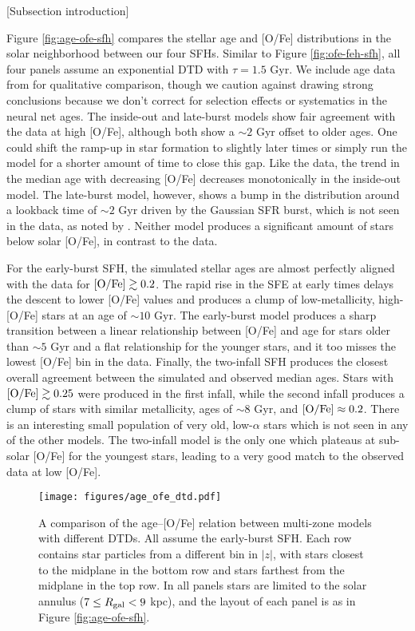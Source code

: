 \documentclass[twocolumn,twocolappendix,linenumbers,trackchanges]{aastex631}
\begin{document}
[Subsection introduction]

Figure \ref{fig:age-ofe-sfh} compares the stellar age and [O/Fe] distributions in the solar neighborhood between our four SFHs. Similar to Figure \ref{fig:ofe-feh-sfh}, all four panels assume an exponential DTD with $\tau=1.5$ Gyr. We include age data from  for qualitative comparison, though we caution against drawing strong conclusions because we don't correct for selection effects or systematics in the neural net ages. The inside-out and late-burst models show fair agreement with the data at high [O/Fe], although both show a $\sim2$ Gyr offset to older ages. One could shift the ramp-up in star formation to slightly later times or simply run the model for a shorter amount of time to close this gap. Like the data, the trend in the median age with decreasing [O/Fe] decreases monotonically in the inside-out model. The late-burst model, however, shows a bump in the distribution around a lookback time of $\sim2$ Gyr driven by the Gaussian SFR burst, which is not seen in the data, as noted by . Neither model produces a significant amount of stars below solar [O/Fe], in contrast to the data.

For the early-burst SFH, the simulated stellar ages are almost perfectly aligned with the data for ${\rm [O/Fe]}\gtrsim 0.2$. The rapid rise in the SFE at early times delays the descent to lower [O/Fe] values and produces a clump of low-metallicity, high-[O/Fe] stars at an age of $\sim10$ Gyr. The early-burst model produces a sharp transition between a linear relationship between [O/Fe] and age for stars older than $\sim5$ Gyr and a flat relationship for the younger stars, and it too misses the lowest [O/Fe] bin in the data. Finally, the two-infall SFH produces the closest overall agreement between the simulated and observed median ages. Stars with ${\rm [O/Fe]}\gtrsim 0.25$ were produced in the first infall, while the second infall produces a clump of stars with similar metallicity, ages of $\sim8$ Gyr, and ${\rm [O/Fe]}\approx0.2$. There is an interesting small population of very old, low-$\alpha$ stars which is not seen in any of the other models. The two-infall model is the only one which plateaus at sub-solar [O/Fe] for the youngest stars, leading to a very good match to the observed data at low [O/Fe].

\begin{figure*}
    \centering
    \texttt{[image: figures/age\_ofe\_dtd.pdf]}
    \caption{A comparison of the age--[O/Fe] relation between multi-zone models with different DTDs. All assume the early-burst SFH. Each row contains star particles from a different bin in $|z|$, with stars closest to the midplane in the bottom row and stars farthest from the midplane in the top row. In all panels stars are limited to the solar annulus ($7\leq R_{\rm gal}<9$ kpc), and the layout of each panel is as in Figure \ref{fig:age-ofe-sfh}.}
    \label{fig:age-ofe-dtd}
\end{figure*}
\end{document}
